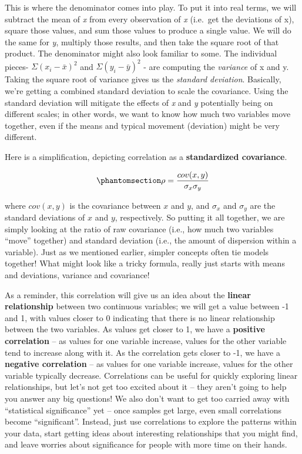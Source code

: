 \documentclass[
  letterpaper,
]{krantz}
\begin{document}
This is where the denominator comes into play. To put it into real
terms, we will subtract the mean of \emph{x} from every observation of
\emph{x} (i.e.~get the deviations of x), square those values, and sum
those values to produce a single value. We will do the same for
\emph{y}, multiply those results, and then take the square root of that
product. The denominator might also look familiar to some. The
individual pieces- \(\Sigma(x_i-\bar{x})^2\) and
\(\Sigma(y_i-\bar{y})^2\) - are computing the \emph{variance} of x and
y. Taking the square root of variance gives us the \emph{standard
deviation}. Basically, we're getting a combined standard deviation to
scale the covariance. Using the standard deviation will mitigate the
effects of \emph{x} and \emph{y} potentially being on different scales;
in other words, we want to know how much two variables move together,
even if the means and typical movement (deviation) might be very
different.

Here is a simplification, depicting correlation as a
\textbf{standardized covariance}.

\begin{equation}\phantomsection\label{eq-corcov}{
\rho = \frac{cov(x,y)}{\sigma_x\sigma_y}
}\end{equation}

where \(cov(x,y)\) is the covariance between \(x\) and \(y\), and
\(\sigma_x\) and \(\sigma_y\) are the standard deviations of \(x\) and
\(y\), respectively. So putting it all together, we are simply looking
at the ratio of raw covariance (i.e., how much two variables ``move''
together) and standard deviation (i.e., the amount of dispersion within
a variable). Just as we mentioned earlier, simpler concepts often tie
models together! What might look like a tricky formula, really just
starts with means and deviations, variance and covariance!

As a reminder, this correlation will give us an idea about the
\textbf{linear relationship} between two continuous variables; we will
get a value between -1 and 1, with values closer to 0 indicating that
there is no linear relationship between the two variables. As values get
closer to 1, we have a \textbf{positive correlation} -- as values for
one variable increase, values for the other variable tend to increase
along with it. As the correlation gets closer to -1, we have a
\textbf{negative correlation} -- as values for one variable increase,
values for the other variable typically decrease. Correlations can be
useful for quickly exploring linear relationships, but let's not get too
excited about it -- they aren't going to help you answer any big
questions! We also don't want to get too carried away with ``statistical
significance'' yet -- once samples get large, even small correlations
become ``significant''. Instead, just use correlations to explore the
patterns within your data, start getting ideas about interesting
relationships that you might find, and leave worries about significance
for people with more time on their hands.
\end{document}
